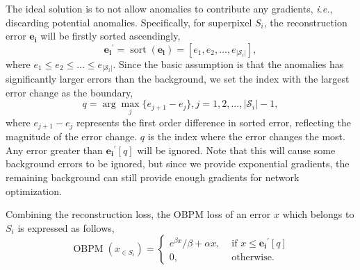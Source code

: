 The ideal solution is to not allow anomalies to contribute any gradients, \textit{i.e.}, discarding potential anomalies. Specifically, for superpixel $S_i$, the reconstruction error $\mathbf{e_i}$ will be firstly sorted ascendingly, 
\begin{equation}
\mathbf{e_i}^{\prime} = \operatorname{sort}(\mathbf{e_i}) = [e_1, e_2, \ldots, e_{|\mathcal{S}_i|}],
\end{equation}
where $e_1 \leq e_2 \leq \ldots \leq e_{|\mathcal{S}_i|}$. Since the basic assumption is that the anomalies has significantly larger errors than the background, we set the index with the largest error change as the boundary,
\begin{equation}
    q = \arg\max_{j} \{e_{j+1} - e_j \}, j = 1, 2, \ldots, |\mathcal{S}_i|-1,
\end{equation}
where $e_{j+1} - e_j$ represents the first order difference in sorted error, reflecting the magnitude of the error change. $q$ is the index where the error changes the most. Any error greater than $\mathbf{e_i}^{\prime}[q]$ will be ignored. Note that this will cause some background errors to be ignored, but since we provide exponential gradients, the remaining background can still provide enough gradients for network optimization. 

Combining the reconstruction loss, the OBPM loss of an error $x$ which belongs to $S_i$ is expressed as follows,
\begin{equation}
    \operatorname{OBPM}(x_{\in S_i})=
    \begin{cases}
        e^{\beta x} / \beta + \alpha x, & \text{ if } x \leq \mathbf{e_i}^{\prime}[q] \\
       0, & \text{ otherwise} .
      \end{cases}
\end{equation}

